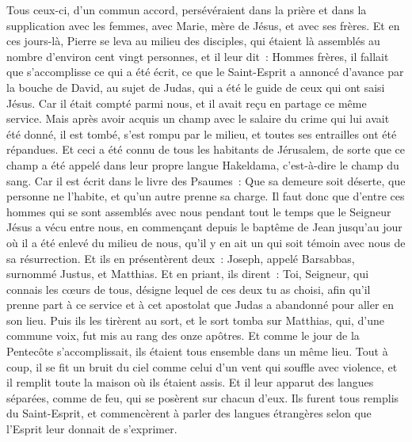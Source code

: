 \begin{multicols}{2}
Tous ceux-ci, d'un commun accord, persévéraient dans la prière et dans la supplication avec les femmes, avec Marie, mère de Jésus, et avec ses frères.
Et en ces jours-là, Pierre se leva au milieu des disciples, qui étaient là assemblés au nombre d'environ cent vingt personnes, et il leur dit~:
Hommes frères, il fallait que s'accomplisse ce qui a été écrit, ce que le Saint-Esprit a annoncé d'avance par la bouche de David, au sujet de Judas, qui a été le guide de ceux qui ont saisi Jésus.
Car il était compté parmi nous, et il avait reçu en partage ce même service.
Mais après avoir acquis un champ avec le salaire du crime qui lui avait été donné, il est tombé, s'est rompu par le milieu, et toutes ses entrailles ont été répandues.
Et ceci a été connu de tous les habitants de Jérusalem, de sorte que ce champ a été appelé dans leur propre langue Hakeldama, c'est-à-dire le champ du sang.
Car il est écrit dans le livre des Psaumes~: Que sa demeure soit déserte, que personne ne l'habite, et qu'un autre prenne sa charge.
Il faut donc que d'entre ces hommes qui se sont assemblés avec nous pendant tout le temps que le Seigneur Jésus a vécu entre nous,
en commençant depuis le baptême de Jean jusqu'au jour où il a été enlevé du milieu de nous, qu'il y en ait un qui soit témoin avec nous de sa résurrection.
Et ils en présentèrent deux~: Joseph, appelé Barsabbas, surnommé Justus, et Matthias.
Et en priant, ils dirent~: Toi, Seigneur, qui connais les cœurs de tous, désigne lequel de ces deux tu as choisi,
afin qu'il prenne part à ce service et à cet apostolat que Judas a abandonné pour aller en son lieu.
Puis ils les tirèrent au sort, et le sort tomba sur Matthias, qui, d'une commune voix, fut mis au rang des onze apôtres.
\VerseOne{}Et comme le jour de la Pentecôte s'accomplissait, ils étaient tous ensemble dans un même lieu.
Tout à coup, il se fit un bruit du ciel comme celui d'un vent qui souffle avec violence, et il remplit toute la maison où ils étaient assis.
Et il leur apparut des langues séparées, comme de feu, qui se posèrent sur chacun d'eux.
Ils furent tous remplis du Saint-Esprit, et commencèrent à parler des langues étrangères selon que l'Esprit leur donnait de s'exprimer.

\end{multicols}
